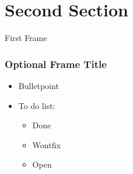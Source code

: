  \section{Second Section}
  \begin{frame}{First Frame}
    \frametitle{Optional Frame Title} %
	\vskip5mm
	\vspace{-0.4cm} %
	\begin{itemize}
		\itemsep1.2em
		\item Bulletpoint
		\item To do list:
		\begin{itemize}
			\itemsep1.2em
			\item[\done] Done\cite{4351913}
			\item[\wontfix] Wontfix
			\item[\open] Open
		\end{itemize}
	\end{itemize}
  \end{frame}



